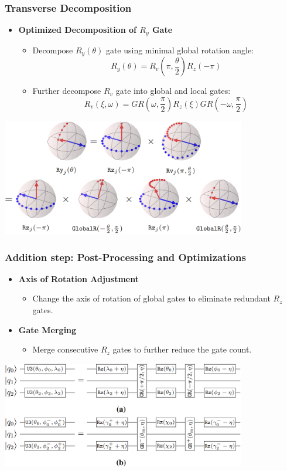 \documentclass[18 pt]{beamer}
\begin{document}
\begin{frame}
    \frametitle{Transverse Decomposition}
    \begin{itemize}
        \item \textbf{Optimized Decomposition of $R_y$ Gate}
        \begin{itemize}
            \item Decompose $R_y(\theta)$ gate using minimal global rotation angle:
            \[
            R_y(\theta) = R_v\left(\pi, \frac{\theta}{2}\right) R_z(-\pi)
            \]
            \item Further decompose $R_v$ gate into global and local gates:
            \[
            R_v(\xi, \omega) = GR(\omega, \frac{\pi}{2}) R_z(\xi) GR(-\omega, \frac{\pi}{2})
            \]
        \end{itemize}
    \end{itemize}
    \begin{center}
        \includegraphics[width=0.8\textwidth]{transverse_.png}
    \end{center}
\end{frame}
\begin{frame}
    \frametitle{Addition step: Post-Processing and Optimizations}
    \begin{itemize}
        \item \textbf{Axis of Rotation Adjustment}
        \begin{itemize}
            \item Change the axis of rotation of global gates to eliminate redundant $R_z$ gates.
        \end{itemize}
        \item \textbf{Gate Merging}
        \begin{itemize}
            \item Merge consecutive $R_z$ gates to further reduce the gate count.
        \end{itemize}
    \end{itemize}
    \begin{center}
        \includegraphics[width=0.8\textwidth]{axis.png}
    \end{center}
\end{frame}
\end{document}
